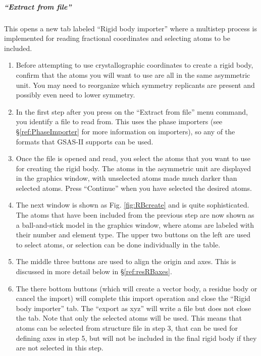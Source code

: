 \subparagraph{``Extract from file''}\label{ref:ExtractRB} This opens a new tab labeled ``Rigid body importer'' where a multistep process is implemented for reading fractional coordinates and selecting atoms to be included. 
\begin{enumerate}
    \item Before attempting to use crystallographic coordinates to create a rigid body, confirm that the atoms you will want to use are all in the same asymmetric unit. You may need to reorganize which symmetry replicants are present and possibly even need to lower symmetry. 
    \item In the first step after you press on the ``Extract from file'' menu command, you identify a file to read from. This uses the phase importers (see \S\ref{ref:PhaseImporter} for more information on importers), so any of the formats that GSAS-II supports can be used. 
    \item Once the file is opened and read, you select the atoms that you want to use for creating the rigid body. The atoms in the asymmetric unit are displayed in the graphics window, with unselected atoms made much darker than selected atoms. Press ``Continue'' when you have selected the desired atoms. 
    \item The next window is shown as Fig. \ref{fig:RBcreate} and is quite sophisticated. The atoms that have been included from the previous step are now shown as a ball-and-stick model in the graphics window, where atoms are labeled with their number and element type.  The upper two buttons on the left are used to select atoms, or selection can be done individually in the table. 
    \item The middle three buttons are used to align the origin and axes. This is discussed in more detail below in \S\ref{ref:resRBaxes}.
    \item The there bottom buttons (which will create a vector body, a residue body or cancel the import) will complete this import operation and close the ``Rigid body importer'' tab. The ``export as xyz'' will write a file but does not close the tab. Note that only the selected atoms will be used. This means that atoms can be selected from structure file in step 3, that can be used for defining axes in step 5, but will not be included in the final rigid body if they are not selected in this step.
\end{enumerate}


